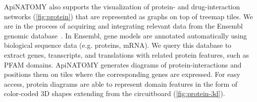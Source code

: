 ApiNATOMY also supports the visualization of protein- and drug-interaction networks (\cref{fig:protein}) that are represented as graphs on top of treemap tiles. We are in the process of acquiring and integrating relevant data from the Ensembl genomic database~\cite{Ensemble}. In Ensembl, gene models are annotated automatically using biological sequence data (e.g. proteins, mRNA). We query this database to extract genes, transcripts, and translations with related protein features, such as PFAM domains. ApiNATOMY generates diagrams of protein-interactions and positions them on tiles where the corresponding genes are expressed. For easy access, protein diagrams are able to represent domain features in the form of color-coded 3D shapes extending from the circuitboard (\cref{fig:protein-3d}).

